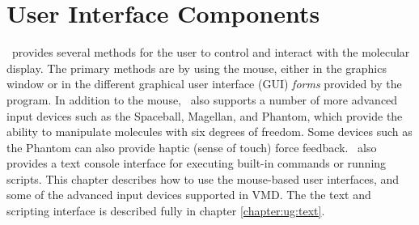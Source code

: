%
%
%

\chapter{User Interface Components}
\label{chapter:ug:uis}

\VMD\ provides several methods for the user to control and
interact with the molecular display.  The primary methods are by using the
mouse, either in the graphics window or in the different graphical user 
interface (GUI) {\em forms} provided by the program.  
In addition to the mouse, \VMD\ also supports a number of more advanced 
input devices such as the Spaceball, Magellan, and Phantom, 
which provide the ability to manipulate molecules with six degrees of freedom.
Some devices such as the Phantom can also provide haptic (sense of touch) 
force feedback.
\VMD\ also provides a text console interface for executing built-in commands 
or running scripts.  
This chapter describes how to use the mouse-based user interfaces, 
and some of the advanced input devices supported in VMD. 
The the text and scripting interface is described fully in 
chapter \ref{chapter:ug:text}.









